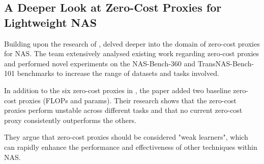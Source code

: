 \subsection{A Deeper Look at Zero-Cost Proxies for Lightweight NAS}

Building upon the research of \cite{abdelfattah2021zero}, \cite{colin2022adeeperlook} delved deeper into the domain of zero-cost proxies for \gls{NAS}. The team extensively analysed existing work regarding zero-cost proxies and performed novel experiments on the NAS-Bench-360 \autocite{tu2021bench} and TransNAS-Bench-101 \autocite{duan2021transnas} benchmarks to increase the range of datasets and tasks involved.

In addition to the six zero-cost proxies in \cite{abdelfattah2021zero}, the paper added two baseline zero-cost proxies (\gls{FLOPs} and params). Their research shows that the zero-cost proxies perform unstable across different tasks and that no current zero-cost proxy consistently outperforms the others. 

They argue that zero-cost proxies should be considered "weak learners", which can rapidly enhance the performance and effectiveness of other techniques within \gls{NAS}. 

